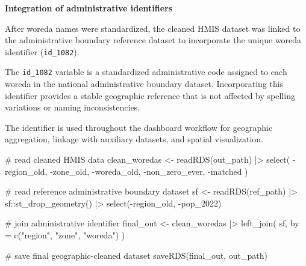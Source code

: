 \documentclass[
  letterpaper,
  DIV=11,
  numbers=noendperiod]{scrartcl}
\newenvironment{Shaded}{\begin{snugshade}}{\end{snugshade}}
\newcommand{\AttributeTok}[1]{\textcolor[rgb]{0.40,0.45,0.13}{#1}}
\newcommand{\CommentTok}[1]{\textcolor[rgb]{0.37,0.37,0.37}{#1}}
\newcommand{\FunctionTok}[1]{\textcolor[rgb]{0.28,0.35,0.67}{#1}}
\newcommand{\NormalTok}[1]{\textcolor[rgb]{0.00,0.23,0.31}{#1}}
\newcommand{\OtherTok}[1]{\textcolor[rgb]{0.00,0.23,0.31}{#1}}
\newcommand{\SpecialCharTok}[1]{\textcolor[rgb]{0.37,0.37,0.37}{#1}}
\newcommand{\StringTok}[1]{\textcolor[rgb]{0.13,0.47,0.30}{#1}}
\begin{document}
\textbf{Integration of administrative identifiers}

After woreda names were standardized, the cleaned HMIS dataset was
linked to the administrative boundary reference dataset to incorporate
the unique woreda identifier (\texttt{id\_1082}).

The \texttt{id\_1082} variable is a standardized administrative code
assigned to each woreda in the national administrative boundary dataset.
Incorporating this identifier provides a stable geographic reference
that is not affected by spelling variations or naming inconsistencies.

The identifier is used throughout the dashboard workflow for geographic
aggregation, linkage with auxiliary datasets, and spatial visualization.

\begin{Shaded}
\begin{Highlighting}[]
\CommentTok{\# read cleaned HMIS data}
\NormalTok{clean\_woredas }\OtherTok{\textless{}{-}} \FunctionTok{readRDS}\NormalTok{(out\_path) }\SpecialCharTok{|\textgreater{}}
  \FunctionTok{select}\NormalTok{(}
    \SpecialCharTok{{-}}\NormalTok{region\_old,}
    \SpecialCharTok{{-}}\NormalTok{zone\_old,}
    \SpecialCharTok{{-}}\NormalTok{woreda\_old,}
    \SpecialCharTok{{-}}\NormalTok{non\_zero\_ever,}
    \SpecialCharTok{{-}}\NormalTok{matched}
\NormalTok{  )}

\CommentTok{\# read reference administrative boundary dataset}
\NormalTok{sf }\OtherTok{\textless{}{-}} \FunctionTok{readRDS}\NormalTok{(ref\_path) }\SpecialCharTok{|\textgreater{}}
\NormalTok{  sf}\SpecialCharTok{::}\FunctionTok{st\_drop\_geometry}\NormalTok{() }\SpecialCharTok{|\textgreater{}}
  \FunctionTok{select}\NormalTok{(}\SpecialCharTok{{-}}\NormalTok{region\_old, }\SpecialCharTok{{-}}\NormalTok{pop\_2022)}

\CommentTok{\# join administrative identifier}
\NormalTok{final\_out }\OtherTok{\textless{}{-}}\NormalTok{ clean\_woredas }\SpecialCharTok{|\textgreater{}}
  \FunctionTok{left\_join}\NormalTok{(}
\NormalTok{    sf,}
    \AttributeTok{by =} \FunctionTok{c}\NormalTok{(}\StringTok{"region"}\NormalTok{, }\StringTok{"zone"}\NormalTok{, }\StringTok{"woreda"}\NormalTok{)}
\NormalTok{  )}

\CommentTok{\# save final geographic{-}cleaned dataset}
\FunctionTok{saveRDS}\NormalTok{(final\_out, out\_path)}
\end{Highlighting}
\end{Shaded}
\end{document}
